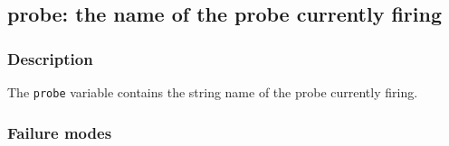 \clearpage
{}
{}
\label{varsprobe}
\subsection*{probe: the name of the probe currently firing}

\subsubsection*{Description}

The \verb|probe| variable contains the string name of the probe
currently firing.

\subsubsection*{Failure modes}

